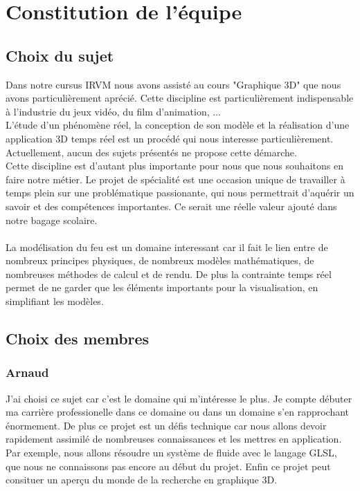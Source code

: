 \documentclass[a4paper,10pt]{article}
\begin{document}
\newpage

\tableofcontents

\newpage









\section{Constitution de l'équipe}

\subsection{Choix du sujet}

Dans notre cursus IRVM nous avons assisté au cours "Graphique 3D" que nous avons particulièrement aprécié. Cette discipline est particulièrement indispensable à l'industrie du jeux vidéo, du film d'animation, ... \\
L'étude d'un phénomène réel, la conception de son modèle et la réalisation d'une application 3D temps réel est un procédé qui nous interesse particulièrement. Actuellement, aucun des sujets présentés ne propose cette démarche.\\
Cette discipline est d'autant plus importante pour nous que nous souhaitons en faire notre métier. Le projet de spécialité est une occasion unique de travailler à temps plein sur une problématique passionante, qui nous permettrait d'aquérir un savoir et des compétences importantes. Ce serait une réelle valeur ajouté dans notre bagage scolaire.\\
~\\
La modélisation du feu est un domaine interessant car il fait le lien entre de nombreux principes physiques, de nombreux modèles mathématiques, de nombreuses méthodes de calcul et de rendu. De plus la contrainte temps réel permet de ne garder que les éléments importants pour la visualisation, en simplifiant les modèles.

\subsection{Choix des membres}
\subsubsection{Arnaud}
    J'ai choisi ce sujet car c'est le domaine qui m'intéresse le plus. Je compte débuter ma carrière professionelle dans ce domaine ou dans un domaine s'en rapprochant énormement. De plus ce projet est un défis technique car nous allons devoir rapidement assimilé de nombreuses connaissances et les mettres en application. Par exemple, nous allons résoudre un système de fluide avec le langage GLSL, que nous ne connaissons pas encore au début du projet. Enfin ce projet peut consituer un aperçu du monde de la recherche en graphique 3D.\\
\end{document}
